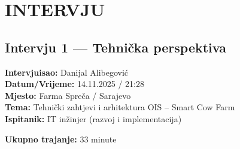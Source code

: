 \documentclass{article}
\begin{document}
\newpage
\section{INTERVJU}

\subsection*{Intervju 1 — Tehnička perspektiva}

\noindent
\textbf{Intervjuisao:} Danijal Alibegović \\
\textbf{Datum/Vrijeme:} 14.11.2025 / 21:28 \\
\textbf{Mjesto:} Farma Spreča / Sarajevo \\
\textbf{Tema:} Tehnički zahtjevi i arhitektura OIS -- Smart Cow Farm \\
\textbf{Ispitanik:} IT inžinjer (razvoj i implementacija)

\vspace{1em}
\noindent\textbf{Ukupno trajanje:} 33 minute
\end{document}

